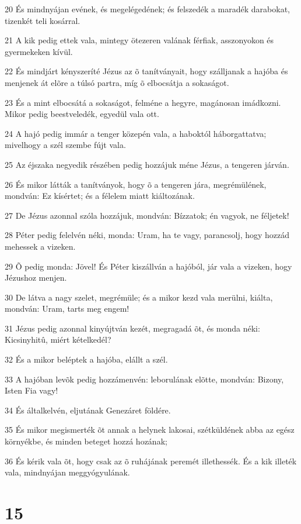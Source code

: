 \par 20 És mindnyájan evének, és megelégedének; és felszedék a maradék darabokat, tizenkét teli kosárral.
\par 21 A kik pedig ettek vala, mintegy ötezeren valának férfiak, asszonyokon és gyermekeken kívül.
\par 22 És mindjárt kényszeríté Jézus az õ tanítványait, hogy szálljanak a hajóba és menjenek át elõre a túlsó partra, míg õ elbocsátja a sokaságot.
\par 23 És a mint elbocsátá a sokaságot, felméne a hegyre, magánosan imádkozni. Mikor pedig beestveledék, egyedül vala ott.
\par 24 A hajó pedig immár a tenger közepén vala, a haboktól háborgattatva; mivelhogy a szél szembe fújt vala.
\par 25 Az éjszaka negyedik részében pedig hozzájuk méne Jézus, a tengeren járván.
\par 26 És mikor látták a tanítványok, hogy õ a tengeren jára, megrémülének, mondván: Ez kísértet; és a félelem miatt kiáltozának.
\par 27 De Jézus azonnal szóla hozzájuk, mondván: Bízzatok; én vagyok, ne féljetek!
\par 28 Péter pedig felelvén néki, monda: Uram, ha te vagy, parancsolj, hogy hozzád mehessek a vizeken.
\par 29 Õ pedig monda: Jövel! És Péter kiszállván a hajóból, jár vala a vizeken, hogy Jézushoz menjen.
\par 30 De látva a nagy szelet, megrémüle; és a mikor kezd vala merülni, kiálta, mondván: Uram, tarts meg engem!
\par 31 Jézus pedig azonnal kinyújtván kezét, megragadá õt, és monda néki: Kicsinyhitû, miért kételkedél?
\par 32 És a mikor beléptek a hajóba, elállt a szél.
\par 33 A hajóban levõk pedig hozzámenvén: leborulának elõtte, mondván: Bizony, Isten Fia vagy!
\par 34 És általkelvén, eljutának Genezáret földére.
\par 35 És mikor megismerték õt annak a helynek lakosai, szétküldének abba az egész környékbe, és minden beteget hozzá hozának;
\par 36 És kérik vala õt, hogy csak az õ ruhájának peremét illethessék. És a kik illeték vala, mindnyájan meggyógyulának.

\chapter{15}

